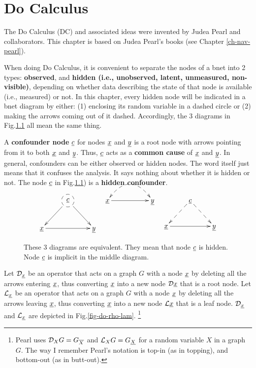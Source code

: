 \chapter{Do Calculus}\label{ch-do-calc}


The Do Calculus (DC) and associated ideas were
invented by
Judea Pearl and collaborators.
This chapter is
based on Judea Pearl's
books (see Chapter \ref{ch-nav-pearl}).


When
doing
Do Calculus,
it is
convenient
to separate
the nodes
of a bnet
into
2  types:
{\bf observed},
and {\bf hidden (i.e., unobserved, latent,
unmeasured, non-visible)},
depending
on
whether data
describing
the
state
of that
node
is available  (i.e., measured) or not.
In this chapter, every
hidden node will
be indicated
in a bnet
diagram by
either: (1)
enclosing
its random variable
in a dashed circle or
(2) making
the arrows
coming
out of it
dashed.
Accordingly,
the
3 diagrams
in
Fig.\ref{fig-hidden-dashes}
all mean the same thing.

A {\bf confounder node} $\rvc$
for nodes $\rvx$ and $\rvy$
is a root node
with arrows
pointing
from it to
both
$\rvx$ and $\rvy$.
Thus, $\rvc$ acts as a {\bf common cause}
of $\rvx$ and $\rvy$.
In general, confounders
can be either observed
or hidden nodes.
The word  itself
just means that it confuses
the analysis.
It says nothing about
whether it is hidden or not.
The node
$\rvc$
in Fig.\ref{fig-hidden-dashes})
is a {\bf hidden confounder}.

\begin{figure}[h!]
$$\xymatrix{
&*++[F-o]{\rvc}\ar[dl]\ar[dr]
\\
\rvx\ar[rr]&&\rvy
}
\;\;\;
\xymatrix{
\rvx\ar@{-->}@{<-->}@/^2pc/[rr]
\ar[rr]&&\rvy
}
\;\;\;
\xymatrix{
&\rvc\ar@{-->}[dl]\ar@{-->}[dr]
\\
\rvx\ar[rr]&&\rvy
}$$
\caption{
These 3 diagrams
are equivalent.
They
mean that node $\rvc$
is hidden.
Node $\rvc$
is implicit
in the
middle diagram.}
\label{fig-hidden-dashes}
\end{figure}



Let
$\cald_\rvx$
be an operator
that acts on a graph $G$
with a node
$\rvx$
by
deleting
all
the
arrows
entering
$\rvx$,
thus
converting
$\rvx$
into
a new
node $\cald \rvx$
that
is a root node.
Let
$\call_\rvx$
be an operator that acts
on a graph $G$
with a node
$\rvx$
by deleting
all
the
arrows
leaving
$\rvx$,
thus
converting
$\rvx$
into
a new
node $\call \rvx$
that
is a leaf node.
$\cald_\rvx$
and
$\call_\rvx$
are
depicted
in Fig.\ref{fig-do-rho-lam}.
\footnote{Pearl
uses ${\cal D}_X G=
G_{\overline{X}}
$
and
$\call_X G=
G_{\ul{X}}$
for a random variable $X$
in a graph $G$.
The way I remember
Pearl's notation is top-in (as in topping), and
bottom-out (as in butt-out).}




